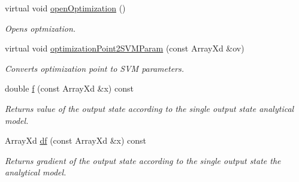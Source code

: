 \begin{DoxyCompactItemize}
virtual void \hyperlink{class_go_s_u_m_1_1_c_single_a_m_acdaa489065049af967092e904004f299}{open\-Optimization} ()
\begin{DoxyCompactList}\small\item\em Opens optmization. \end{DoxyCompactList}\item 
virtual void \hyperlink{class_go_s_u_m_1_1_c_single_a_m_a28c4026a43409c73e27acbdabfff35ee}{optimization\-Point2\-S\-V\-M\-Param} (const Array\-Xd \&ov)
\begin{DoxyCompactList}\small\item\em Converts optimization point to S\-V\-M parameters. \end{DoxyCompactList}\item 
double \hyperlink{class_go_s_u_m_1_1_c_single_a_m_ad70a6e1783983436345ad3a03a409406}{f} (const Array\-Xd \&x) const 
\begin{DoxyCompactList}\small\item\em Returns value of the output state according to the single output state analytical model. \end{DoxyCompactList}\item 
Array\-Xd \hyperlink{class_go_s_u_m_1_1_c_single_a_m_ac24528e4f4356ad0a6921416c4cec866}{df} (const Array\-Xd \&x) const 
\begin{DoxyCompactList}\small\item\em Returns gradient of the output state according to the single output state the analytical model. \end{DoxyCompactList}\end{DoxyCompactItemize}
